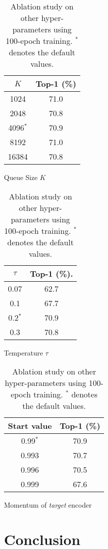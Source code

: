 \documentclass{article}
\begin{document}
\begin{table}[h]
  \begin{subtable}[h]{0.3\textwidth}
  \centering
  \begin{tabular}{cc}
    \toprule
    $K$ &  Top-1 (\%) \\
    \midrule
     1024 & 71.0 \\
     2048 & 70.8 \\
     4096$^*$ & 70.9 \\
     8192 & 71.0 \\
     16384 & 70.8 \\
    \bottomrule
  \end{tabular}
  \caption{Queue Size $K$}
  \label{tab-ablation-queue}
  \end{subtable}
  \hfill
  \begin{subtable}[h]{0.3\textwidth}
  \centering
  \begin{tabular}{cc}
    \toprule
    $\tau$ &  Top-1 (\%). \\
    \midrule
     0.07 & 62.7 \\
     0.1 & 67.7 \\
     0.2$^*$ & 70.9 \\
     0.3 & 70.8 \\
    \bottomrule
  \end{tabular}
  \caption{Temperature $\tau$}
  \label{tab-ablation-temp}
  \end{subtable}
  \hfill
  \begin{subtable}[h]{0.3\textwidth}
  \centering
  \begin{tabular}{cc}
    \toprule
    Start value &  Top-1 (\%) \\
    \midrule
     0.99$^*$ & 70.9 \\
     0.993 & 70.7 \\
     0.996 & 70.5 \\
     0.999 & 67.6 \\
    \bottomrule
  \end{tabular}
  \caption{Momentum of \emph{target} encoder}
  \label{tab-ablation-momentum}
  \end{subtable}
  \caption{Ablation study on other hyper-parameters using 100-epoch training. $^*$ denotes the default values.}
  \label{tab-ablation-hyper-params}
\end{table}

\section{Conclusion}
\end{document}

